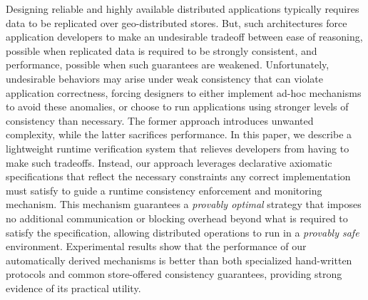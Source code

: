 
  Designing reliable and highly available distributed applications
  typically requires data to be replicated over geo-distributed
  stores.  But, such architectures force application developers to
  make an undesirable tradeoff between ease of reasoning, possible
  when replicated data is required to be strongly consistent, and
  performance, possible when such guarantees are weakened.
  Unfortunately, undesirable behaviors may arise under weak
  consistency that can violate application correctness, forcing
  designers to either implement ad-hoc mechanisms to avoid these
  anomalies, or choose to run applications using stronger levels of
  consistency than necessary. The former approach introduces unwanted
  complexity, while the latter sacrifices performance.  In this paper,
  we describe a lightweight runtime verification system that relieves
  developers from having to make such tradeoffs.  Instead, our
  approach leverages declarative axiomatic specifications that reflect
  the necessary constraints any correct implementation must satisfy to
  guide a runtime consistency enforcement and monitoring mechanism.
  This mechanism guarantees a \emph{provably optimal} strategy that
  imposes no additional communication or blocking overhead beyond what
  is required to satisfy the specification, allowing distributed
  operations to run in a \emph{provably safe} environment.
  Experimental results show that the performance of our automatically
  derived mechanisms is better than both specialized hand-written
  protocols and common store-offered consistency guarantees, providing
  strong evidence of its practical utility.
